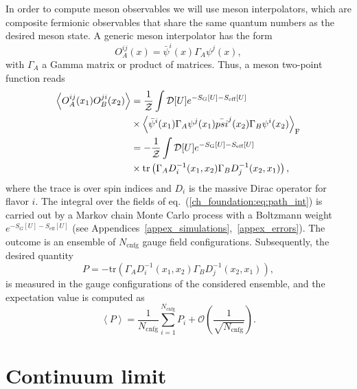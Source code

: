 In order to compute meson observables we will use meson interpolators, which are composite fermionic observables that share the same quantum numbers as the desired meson state. A generic meson interpolator has the form
\begin{equation}
{O}_A^{ij}(x)=\bar{\psi}^i(x)\Gamma_A\psi^j(x),
\end{equation}	
with $\Gamma_A$ a Gamma matrix or product of matrices. Thus, a meson two-point function reads
\begin{align}
\label{ch_foundation:eq:path_int}
\left<{O}_A^{ij}(x_1){O}_B^{ji}(x_2)\right>&=\frac{1}{\mathcal{Z}}\int\mathcal{D}[U]e^{-S_{\textrm G}[U]-S_{\textrm{eff}}[U]}\notag\\
&\times\left<\bar{\psi}^i(x_1)\Gamma_A\psi^j(x_1)\bar{psi}^j(x_2)\Gamma_B\psi^i(x_2)\right>_{\textrm F}  \\
&=-\frac{1}{\mathcal{Z}}\int\mathcal{D}[U]e^{-S_{\textrm G}[U]-S_{\textrm{eff}}[U]}\notag\\
&\times{\textrm{tr}}\left(\Gamma_AD_i^{-1}(x_1,x_2)\Gamma_BD_j^{-1}(x_2,x_1)\right),
\end{align}
where the trace is over spin indices and $D_i$ is the massive Dirac operator for flavor $i$. The integral over the fields of eq.~(\ref{ch_foundation:eq:path_int}) is carried out by a Markov chain Monte Carlo process with a Boltzmann weight 
$e^{-S_G[U]-S_{\textrm{eff}}[U]}$ (see Appendices~\ref{appex_simulations},~\ref{appex_errors}). The outcome is an ensemble  of $N_{\textrm{cnfg}}$ gauge field configurations. Subsequently, the desired quantity
\begin{equation}
P=-{\textrm{tr}}\left(\Gamma_A D_i^{-1}(x_1,x_2)\Gamma_B D_j^{-1}(x_2,x_1)\right),
\end{equation}
is measured in the gauge configurations of the considered ensemble, and the expectation value is computed as
\begin{equation}
\left<P\right>=\frac{1}{N_{\textrm{cnfg}}}\sum_{i=1}^{N_{\textrm{cnfg}}}P_i+\mathcal{O}\left(\frac{1}{\sqrt{N_{\textrm{cnfg}}}}\right).
\end{equation}



\section{Continuum limit}
\label{ch_foundation:sec:continuum-limit}


